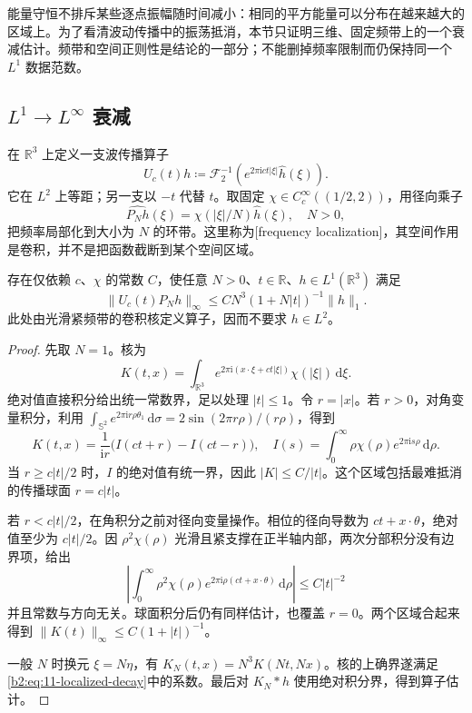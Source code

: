 
能量守恒不排斥某些逐点振幅随时间减小：相同的平方能量可以分布在越来越大的区域上。为了看清波动传播中的振荡抵消，本节只证明三维、固定频带上的一个衰减估计。频带和空间正则性是结论的一部分；不能删掉频率限制而仍保持同一个 \(L^1\) 数据范数。

\subsection{\texorpdfstring{\(L^1\to L^\infty\)}{L¹→L∞} 衰减}
\label{b2:subsec:110401}

在 \(\mathbb R^3\) 上定义一支波传播算子
\[
 U_c(t)h\coloneqq\mathcal F_2^{-1}
 \left(e^{2\pi\mathrm{i}ct|\xi|}\widehat h(\xi)\right).
\]
它在 \(L^2\) 上等距；另一支以 \(-t\) 代替 \(t\)。取固定 \(\chi\in C_c^\infty((1/2,2))\)，用径向乘子
\[
 \widehat{P_Nh}(\xi)=\chi(|\xi|/N)\widehat h(\xi),\quad N>0,
\]
把频率局部化到大小为 \(N\) 的环带。这里称为[frequency localization]，其空间作用是卷积，并不是把函数截断到某个空间区域。

\begin{theorem}[三维频带衰减]\label{b2:thm:11-localized-decay}
存在仅依赖 \(c\)、\(\chi\) 的常数 \(C\)，使任意 \(N>0\)、\(t\in\mathbb R\)、\(h\in L^1(\mathbb R^3)\) 满足
\begin{equation}\label{b2:eq:11-localized-decay}
 \|U_c(t)P_Nh\|_\infty
 \leq C N^3(1+N|t|)^{-1}\|h\|_1.
\end{equation}
此处由光滑紧频带的卷积核定义算子，因而不要求 \(h\in L^2\)。
\end{theorem}
\begin{proof}
先取 \(N=1\)。核为
\[
 K(t,x)=\int_{\mathbb R^3}e^{2\pi\mathrm{i}(x\cdot\xi+ct|\xi|)}
                       \chi(|\xi|)\,\mathrm{d}\xi.
\]
绝对值直接积分给出统一常数界，足以处理 \(|t|\leq1\)。令 \(r=|x|\)。若 \(r>0\)，对角变量积分，利用
\(\int_{\mathbb S^2}e^{2\pi\mathrm{i}r\rho\theta_1}\,\mathrm{d}\sigma
=2\sin(2\pi r\rho)/(r\rho)\)，得到
\[
 K(t,x)=\dfrac1{\mathrm{i}r}\bigl(I(ct+r)-I(ct-r)\bigr),\quad
 I(s)=\int_0^\infty\rho\chi(\rho)e^{2\pi\mathrm{i}s\rho}\,\mathrm{d}\rho.
\]
当 \(r\geq c|t|/2\) 时，\(I\) 的绝对值有统一界，因此 \(|K|\leq C/|t|\)。这个区域包括最难抵消的传播球面 \(r=c|t|\)。

若 \(r<c|t|/2\)，在角积分之前对径向变量操作。相位的径向导数为 \(ct+x\cdot\theta\)，绝对值至少为 \(c|t|/2\)。因 \(\rho^2\chi(\rho)\) 光滑且紧支撑在正半轴内部，两次分部积分没有边界项，给出
\[
 \left|\int_0^\infty\rho^2\chi(\rho)
 e^{2\pi\mathrm{i}\rho(ct+x\cdot\theta)}\,\mathrm{d}\rho\right|
 \leq C|t|^{-2}
\]
并且常数与方向无关。球面积分后仍有同样估计，也覆盖 \(r=0\)。两个区域合起来得到 \(\|K(t)\|_\infty\leq C(1+|t|)^{-1}\)。

一般 \(N\) 时换元 \(\xi=N\eta\)，有 \(K_N(t,x)=N^3K(Nt,Nx)\)。核的上确界遂满足\eqref{b2:eq:11-localized-decay}中的系数。最后对 \(K_N*h\) 使用绝对积分界，得到算子估计。
\end{proof}

